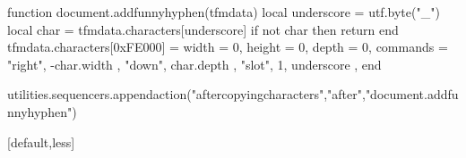 \startluacode

    function document.addfunnyhyphen(tfmdata)
        local underscore = utf.byte("_")
        local char       = tfmdata.characters[underscore]
        if not char then return end
        tfmdata.characters[0xFE000]   = {
            width    = 0,
            height   = 0,
            depth    = 0,
            commands = {
                { "right", -char.width },
                { "down", char.depth },
                { "slot", 1, underscore },
            }
        }
    end


utilities.sequencers.appendaction("aftercopyingcharacters","after","document.addfunnyhyphen")

\stopluacode

\setuplanguage
    [de-DE]
    [spacing=packed,
    lefthyphenmin=2,
    righthyphenmin=2]



\setuphyphenation
    [method=traditional]

\sethyphenationfeatures
    [default,less]

\usemodule[layout]
\chardef{}
\def\charwidthlanguage{\currentmainlanguage}




\startmode[A4]
    \setuppapersize
        [A4]
    \setuplayout
        [setups=*lessstrict,
         backspace=2.18cm,
         width=middle,
         topspace=2cm,
         bottomspace=1.25cm,
         height=middle,
         header=0cm,
         footer=1.5cm]
\stopmode



\startsetups[*lessstrict]
    \setup[reset]
\stopsetups


\setuppagenumbering
    [page=,
     alternative=doublesided,
     location={bottom,right}]


